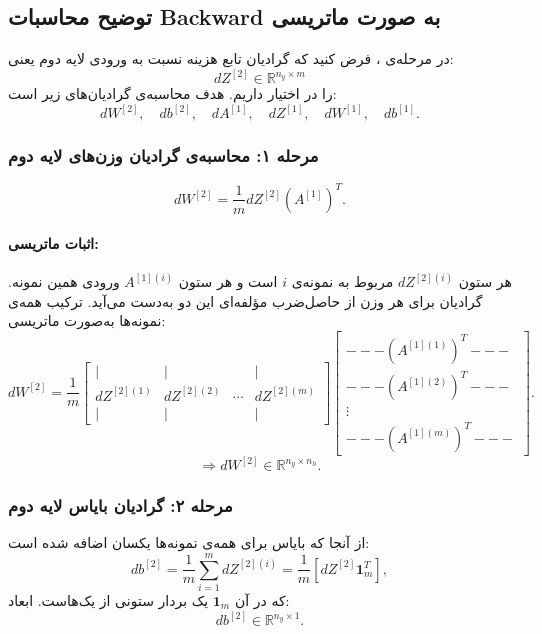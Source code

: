 \documentclass{article}
\begin{document}
\subsection{توضیح محاسبات Backward به صورت ماتریسی}

در مرحله‌ی ، فرض کنید که گرادیان تابع هزینه نسبت به ورودی لایه دوم یعنی:
\[
dZ^{[2]} \in \mathbb{R}^{n_y \times m}
\]
را در اختیار داریم. هدف محاسبه‌ی گرادیان‌های زیر است:
\[
dW^{[2]}, \quad db^{[2]}, \quad dA^{[1]}, \quad dZ^{[1]}, \quad dW^{[1]}, \quad db^{[1]}.
\]

\subsubsection*{مرحله ۱: محاسبه‌ی گرادیان وزن‌های لایه دوم}
\[
dW^{[2]} = \frac{1}{m} dZ^{[2]} (A^{[1]})^T.
\]

\paragraph{اثبات ماتریسی:}
هر ستون \( dZ^{[2](i)} \) مربوط به نمونه‌ی \( i \) است و هر ستون \( A^{[1](i)} \) ورودی همین نمونه. گرادیان برای هر وزن از حاصل‌ضرب مؤلفه‌ای این دو به‌دست می‌آید.  
ترکیب همه‌ی نمونه‌ها به‌صورت ماتریسی:
\[
dW^{[2]} 
=
\frac{1}{m}
\begin{bmatrix}
	| & | &  & | \\
	dZ^{[2](1)} & dZ^{[2](2)} & \cdots & dZ^{[2](m)} \\
	| & | &  & |
\end{bmatrix}
\begin{bmatrix}
	--- (A^{[1](1)})^T --- \\
	--- (A^{[1](2)})^T --- \\
	\vdots \\
	--- (A^{[1](m)})^T ---
\end{bmatrix}.
\]
\[
\Rightarrow dW^{[2]} \in \mathbb{R}^{n_y \times n_h}.
\]

\subsubsection*{مرحله ۲: گرادیان بایاس لایه دوم}
از آنجا که بایاس برای همه‌ی نمونه‌ها یکسان اضافه شده است:
\[
db^{[2]} = \frac{1}{m} \sum_{i=1}^{m} dZ^{[2](i)} 
= \frac{1}{m} \left[ dZ^{[2]} \mathbf{1}_m^T \right],
\]
که در آن \(\mathbf{1}_m\) یک بردار ستونی از یک‌هاست.  
ابعاد:
\[
db^{[2]} \in \mathbb{R}^{n_y \times 1}.
\]
\end{document}
